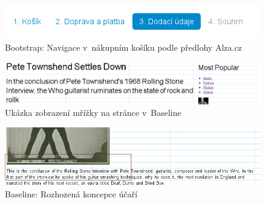 \documentclass[thesis=B,czech]{FITthesis}[2012/06/26]
\begin{document}
\begin{figure}[htb]
	\begin{center}
	\includegraphics[scale=1]{images/image00.png}
	\end{center}
	\caption{Bootstrap: Navigace v~nákupním košíku podle předlohy Alza.cz}
	\label{imgNav}
\end{figure}

\begin{figure}[h]
	\begin{center}
	\includegraphics[scale=0.5]{images/image14.png}
	\end{center}
	\caption{Ukázka zobrazení mřížky na stránce v~Baseline}
	\label{imgBa3}
\end{figure}

\begin{figure}[h]
	\begin{center}
	\includegraphics[scale=0.7]{images/image03.png}
	\end{center}
	\caption{Baseline: Rozhozená koncepce účaří}
	\label{imgBa4}
\end{figure}
\end{document}
